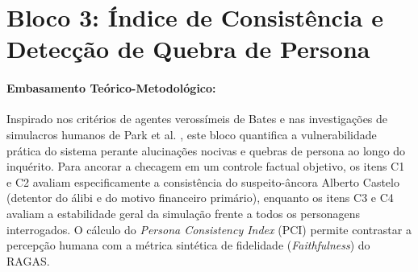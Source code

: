 \vspace{0.05cm}

\section{Bloco 3: Índice de Consistência e Detecção de Quebra de Persona}
\label{sec:apendice_d_bloco3}

\paragraph*{Embasamento Teórico-Metodológico:} Inspirado nos critérios de agentes verossímeis de Bates \cite{bates1994role} e nas investigações de simulacros humanos de Park et al. \cite{park2023generative}, este bloco quantifica a vulnerabilidade prática do sistema perante alucinações nocivas e quebras de persona ao longo do inquérito. Para ancorar a checagem em um controle factual objetivo, os itens C1 e C2 avaliam especificamente a consistência do suspeito-âncora Alberto Castelo (detentor do álibi e do motivo financeiro primário), enquanto os itens C3 e C4 avaliam a estabilidade geral da simulação frente a todos os personagens interrogados. O cálculo do \textit{Persona Consistency Index} (PCI) permite contrastar a percepção humana com a métrica sintética de fidelidade (\textit{Faithfulness}) do RAGAS.

